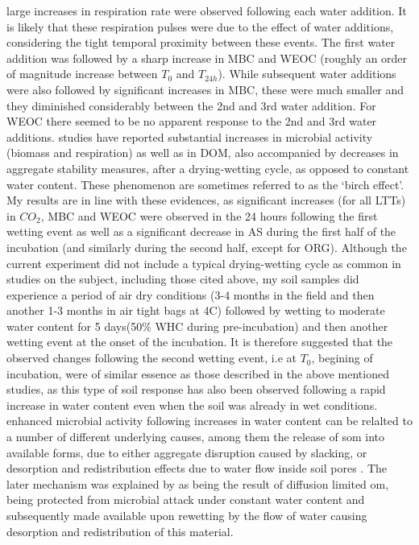 	large increases in respiration rate were observed following each water addition. It is likely that these respiration pulses were due to the effect of water additions, considering the tight temporal proximity between these events. The first water addition was followed by a sharp increase in MBC and WEOC (roughly an order of magnitude increase between $ T_0 $ and $ T_{24h} $). While subsequent water additions were also followed by significant increases in MBC, these were much smaller and they diminished considerably between the 2nd and 3rd water addition. For WEOC there seemed to be no apparent response to the 2nd and 3rd water additions.
	studies have reported substantial increases in microbial activity (biomass and respiration) as well as in DOM\citep{fierer2003}, also accompanied by decreases in aggregate stability measures\citep{cosentino2006}, after a drying-wetting cycle, as opposed to constant water content. These phenomenon are sometimes referred to as the ‘birch effect’.  My results are in line with these evidences, as significant increases (for all LTTs) in  $CO_2 $, MBC and WEOC  were observed in the 24 hours following the first wetting event as well as a significant decrease in AS during the first half of the incubation (and similarly during the second half, except for ORG). Although the current experiment did not include a typical drying-wetting cycle as common in  studies on the subject, including those cited above, my soil samples did experience a period of air dry conditions (3-4 months in the field  and then another 1-3 months in air tight bags at 4C) followed by wetting to moderate water content for 5 days(50\% WHC during pre-incubation) and then another wetting event at the onset of the incubation. It is therefore suggested that the observed changes following the second wetting event, i.e at $ T_0$, begining of incubation, were of similar essence as those described in the above mentioned studies, as this type of soil response has also been observed following a rapid increase in water content even when the soil was already in wet conditions\citep{xiang2008, rey2005}.
	enhanced microbial activity following increases in water content can be relalted to a number of different underlying causes, among them the release of \gls{som} into available forms, due to either aggregate disruption caused by slacking,  or desorption and redistribution effects due to water flow inside soil pores \citep{xiang2008}. The later mechanism was explained by \citeauthor{xiang2008} as being the result of diffusion limited \gls{om}, being protected from microbial attack under constant water content and subsequently made available upon rewetting by the flow of water causing desorption and redistribution of this material. \\
